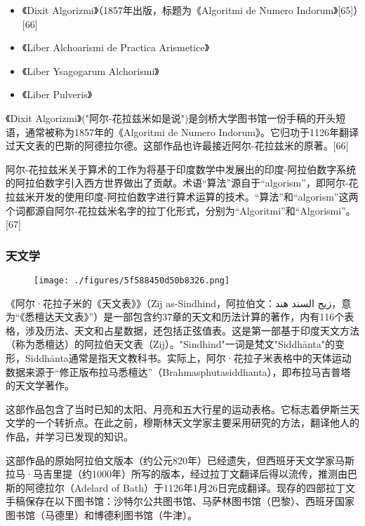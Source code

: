 \begin{itemize}
\item 《Dixit Algorizmi》（1857年出版，标题为《Algoritmi de Numero Indorum》[65]）[66]
\item 《Liber Alchoarismi de Practica Arismetice》
\item 《Liber Ysagogarum Alchorismi》
\item 《Liber Pulveris》
\end{itemize}

《Dixit Algorizmi》("阿尔-花拉兹米如是说")是剑桥大学图书馆一份手稿的开头短语，通常被称为1857年的《Algoritmi de Numero Indorum》。它归功于1126年翻译过天文表的巴斯的阿德拉尔德。这部作品也许最接近阿尔-花拉兹米的原著。[66]

阿尔-花拉兹米关于算术的工作为将基于印度数学中发展出的印度-阿拉伯数字系统的阿拉伯数字引入西方世界做出了贡献。术语“算法”源自于“algorism”，即阿尔-花拉兹米开发的使用印度-阿拉伯数字进行算术运算的技术。“算法”和“algorism”这两个词都源自阿尔-花拉兹米名字的拉丁化形式，分别为“Algoritmi”和“Algorismi”。[67]
\subsubsection{天文学}
\begin{figure}[ht]
\centering
\texttt{[image: ./figures/5f588450d50b8326.png]}
\caption{} \label{fig_HLZM_8}
\end{figure}
《阿尔·花拉子米的《天文表》》（Zīj as-Sindhind，阿拉伯文：زيج السند هند，意为“《悉檀达天文表》”）是一部包含约37章的天文和历法计算的著作，内有116个表格，涉及历法、天文和占星数据，还包括正弦值表。这是第一部基于印度天文方法（称为悉檀达）的阿拉伯天文表（Zij）。"Sindhind"一词是梵文"Siddhānta"的变形，Siddhānta通常是指天文教科书。实际上，阿尔·花拉子米表格中的天体运动数据来源于“修正版布拉马悉檀达”（Brahmasphutasiddhanta），即布拉马吉普塔的天文学著作。

这部作品包含了当时已知的太阳、月亮和五大行星的运动表格。它标志着伊斯兰天文学的一个转折点。在此之前，穆斯林天文学家主要采用研究的方法，翻译他人的作品，并学习已发现的知识。

这部作品的原始阿拉伯文版本（约公元820年）已经遗失，但西班牙天文学家马斯拉马·马吉里提（约1000年）所写的版本，经过拉丁文翻译后得以流传，推测由巴斯的阿德拉尔（Adelard of Bath）于1126年1月26日完成翻译。现存的四部拉丁文手稿保存在以下图书馆：沙特尔公共图书馆、马萨林图书馆（巴黎）、西班牙国家图书馆（马德里）和博德利图书馆（牛津）。